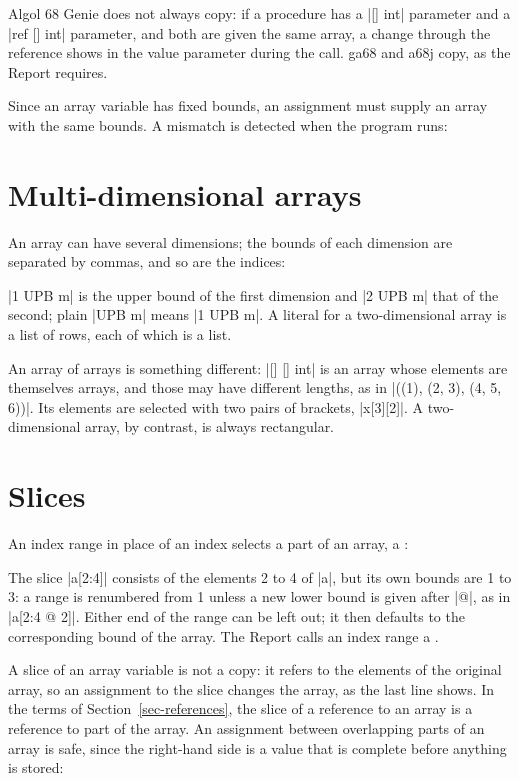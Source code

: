 \begin{implnote}
Algol 68 Genie does not always copy: if a procedure has a \code|[] int|
parameter and a \code|ref [] int| parameter, and both are given the same
array, a change through the reference shows in the value parameter during
the call. ga68 and a68j copy, as the Report requires.
\end{implnote}

Since an array variable has fixed bounds, an assignment must supply an
array with the same bounds. A mismatch is detected when the program runs:


\section{Multi-dimensional arrays}\label{sec-matrices}

An array can have several dimensions; the bounds of each dimension are
separated by commas, and so are the indices:


\code|1 UPB m| is the upper bound of the first dimension and
\code|2 UPB m| that of the second; plain \code|UPB m| means
\code|1 UPB m|. A literal for a two-dimensional array is a list of rows,
each of which is a list.

An array of arrays is something different: \code|[] [] int| is an array
whose elements are themselves arrays, and those may have different
lengths, as in \code|((1), (2, 3), (4, 5, 6))|. Its elements are selected
with two pairs of brackets, \code|x[3][2]|. A two-dimensional array, by
contrast, is always rectangular.

\section{Slices}\label{sec-slices}

An index range in place of an index selects a part of an array, a
:


The slice \code|a[2:4]| consists of the elements 2 to 4 of \code|a|, but
its own bounds are 1 to 3: a range is renumbered from 1 unless a new lower
bound is given after \code|@|, as in \code|a[2:4 @ 2]|. Either end of the
range can be left out; it then defaults to the corresponding bound of the
array. The Report calls an index range a .

A slice of an array variable is not a copy: it refers to the elements of
the original array, so an assignment to the slice changes the array, as
the last line shows. In the terms of Section~\ref{sec-references}, the
slice of a reference to an array is a reference to part of the array.
An assignment between overlapping parts of an array is safe, since the
right-hand side is a value that is complete before anything is stored:

